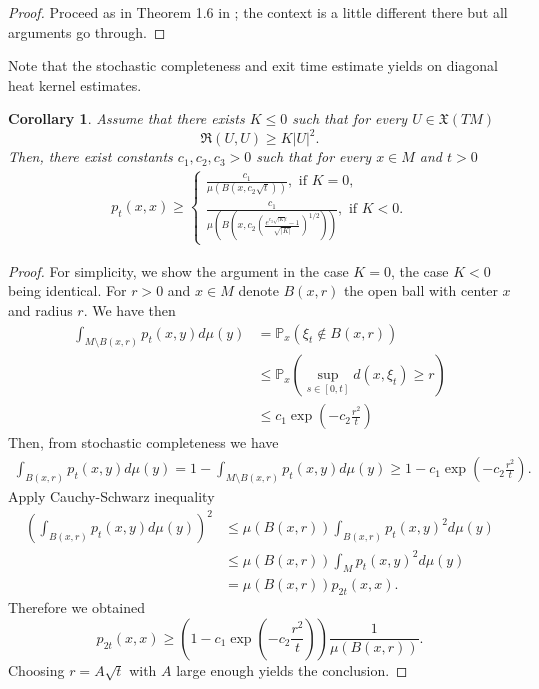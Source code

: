 \documentclass[11pt]{article}
\numberwithin{equation}{section}
\newtheorem{corollary}[theorem]{Corollary}
\begin{document}
  \begin{proof}
  Proceed as in Theorem 1.6 in \cite{MR4091106}; the context is a little different there but all arguments go through.
  \end{proof}
  
  Note that the stochastic completeness and exit time estimate yields on diagonal heat kernel estimates.   

  \begin{corollary}
Assume that there exists $K \le 0$ such that for every $U \in \mathfrak{X}(TM)$
\[
\mathfrak{R}(U,U) \ge K |U|^2.
\] 
Then, there exist  constants $c_1,c_2,c_3>0$ such that for every $x \in M$ and $t>0$
\begin{align*}
p_t(x,x) \ge
\begin{cases}
 \frac{c_1}{\mu(B(x ,c_2\sqrt{t}))}, \text{ if } K=0, \\
 \frac{c_1}{\mu\left(B\left(x ,c_2\left(\frac{e^{c_3\sqrt{|K|}t}-1}{ \sqrt{|K|}} \right)^{1/2}\right)\right)}, \text{ if } K<0.
 \end{cases}
\end{align*}
\end{corollary}
\begin{proof}
For simplicity, we show the argument in the case $K=0$, the case $K<0$ being identical. For $r >0$ and $x \in M$ denote $B(x,r)$ the open ball with center $x$ and radius $r$. We have then
\begin{align*}
\int_{M \setminus B(x,r)} p_t (x,y) d\mu(y) &=\mathbb{P}_x ( \xi_t \notin B(x,r)) \\
 &\le \mathbb{P}_x \left(\sup_{s\in [0,t]} d(x,\xi_t) \ge r \right) \\
 &\le c_1 \exp\left(-c_2 \frac{r^2}{t} \right)
\end{align*}
Then, from stochastic completeness we have
\begin{align*}
 \int_{ B(x,r)} p_t (x,y) d\mu(y)=1-\int_{M \setminus B(x,r)} p_t (x,y) d\mu(y)\ge 1- c_1 \exp\left(-c_2 \frac{r^2}{t} \right).
\end{align*}
  Apply Cauchy-Schwarz inequality
  \begin{align*}
 \left( \int_{ B(x,r)} p_t (x,y) d\mu(y)\right)^2 & \le \mu \left( B(x,r) \right) \int_{ B(x,r)} p_t (x,y)^2 d\mu(y) \\
   & \le  \mu \left( B(x,r) \right) \int_{ M} p_t (x,y)^2 d\mu(y) \\
   &= \mu \left( B(x,r) \right) p_{2t}(x,x).
  \end{align*}
  Therefore we obtained
  \[
  p_{2t}(x,x) \ge \left(1- c_1 \exp\left(-c_2 \frac{r^2}{t} \right)\right)\frac{1}{\mu \left( B(x,r) \right)}.
  \]
  Choosing $r=A\sqrt{t}$ with $A$ large enough yields the conclusion.
  \end{proof}
  
\end{document}
